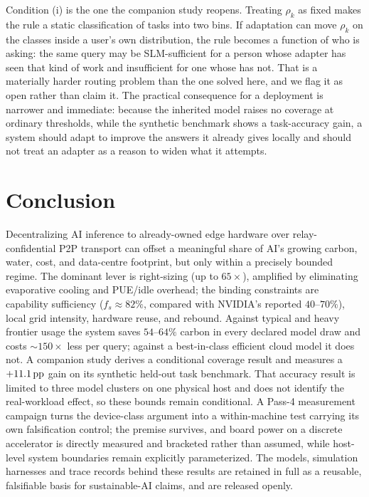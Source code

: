 \documentclass[conference]{IEEEtran}
\newcommand{\pp}{\,\text{pp}}
\newcommand{\fs}{f_{s}}
\begin{document}
Condition (i) is the one the companion study \cite{autoyou2026adaptation}
reopens. Treating $\rho_k$ as fixed makes the rule a static classification of
tasks into two bins. If adaptation can move $\rho_k$ on the classes inside a
user's own distribution, the rule becomes a function of who is asking: the same
query may be SLM-sufficient for a person whose adapter has seen that kind of
work and insufficient for one whose has not. That is a materially harder routing
problem than the one solved here, and we flag it as open rather than claim it.
The practical consequence for a deployment is narrower and immediate: because
the inherited model raises no coverage at ordinary thresholds, while the
synthetic benchmark shows a task-accuracy gain, a system should adapt to
improve the answers it already gives locally and should not treat an adapter as
a reason to widen what it attempts.

\section{Conclusion}
Decentralizing AI inference to already-owned edge hardware over
relay-confidential P2P transport can offset a meaningful share of AI's growing
carbon, water, cost, and data-centre footprint, but only within a precisely
bounded regime. The dominant lever is right-sizing (up to $65\times$), amplified
by eliminating evaporative cooling and PUE/idle overhead; the binding constraints
are capability sufficiency ($\fs\approx82\%$, compared with NVIDIA's reported $40$--$70\%$),
local grid intensity, hardware reuse, and rebound. Against typical and heavy
frontier usage the system saves $54$--$64\%$ carbon in every declared model draw
and costs $\sim$$150\times$ less per query; against a best-in-class efficient cloud model it
does not. A companion study \cite{autoyou2026adaptation} derives a conditional
coverage result and measures a $+\AdaptationUplift\pp$ gain on its synthetic
held-out task benchmark. That accuracy result is limited to three model
clusters on one physical host and does not identify the real-workload effect,
so these bounds remain conditional. A Pass-4 measurement
campaign turns the device-class argument into a within-machine test carrying its
own falsification control; the premise survives, and board power on a discrete
accelerator is directly measured and bracketed rather than assumed, while
host-level system boundaries remain explicitly parameterized. The models,
simulation harnesses and trace records behind these results are retained in full
as a reusable, falsifiable basis for sustainable-AI claims, and are released
openly.
\end{document}
